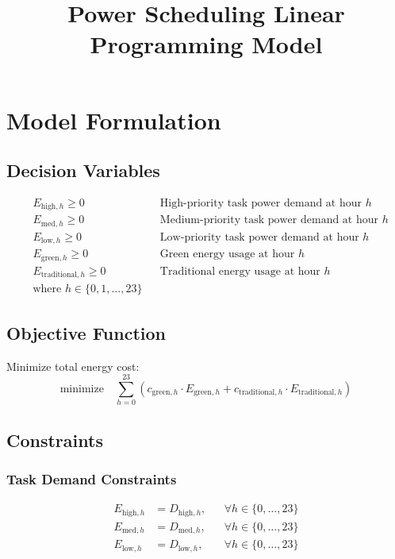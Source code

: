 \documentclass{article}
\title{Power Scheduling Linear Programming Model}
\author{}
\date{}
\begin{document}
\maketitle

\section{Model Formulation}

\subsection{Decision Variables}
\begin{align*}
&E_{\text{high},h} \geq 0 && \text{High-priority task power demand at hour } h \\
&E_{\text{med},h} \geq 0 && \text{Medium-priority task power demand at hour } h \\
&E_{\text{low},h} \geq 0 && \text{Low-priority task power demand at hour } h \\
&E_{\text{green},h} \geq 0 && \text{Green energy usage at hour } h \\
&E_{\text{traditional},h} \geq 0 && \text{Traditional energy usage at hour } h \\
&\text{where } h \in \{0,1,\ldots,23\}
\end{align*}

\subsection{Objective Function}
Minimize total energy cost:
$$
\text{minimize} \quad \sum_{h=0}^{23} \left( c_{\text{green},h} \cdot E_{\text{green},h} + c_{\text{traditional},h} \cdot E_{\text{traditional},h} \right)
$$

\subsection{Constraints}

\subsubsection{Task Demand Constraints}
\begin{align*}
E_{\text{high},h} &= D_{\text{high},h}, && \forall h \in \{0,\ldots,23\} \\
E_{\text{med},h} &= D_{\text{med},h}, && \forall h \in \{0,\ldots,23\} \\
E_{\text{low},h} &= D_{\text{low},h}, && \forall h \in \{0,\ldots,23\}
\end{align*}
\end{document}
